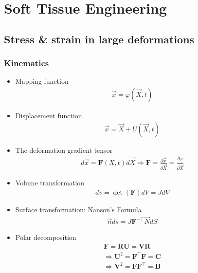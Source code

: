 \documentclass[../main.tex]{subfiles}
\begin{document}
\chapter{Soft Tissue Engineering}

\section{Stress \& strain in large deformations}

\subsection{Kinematics}

\begin{itemize}
    \item Mapping function 
    \begin{align}
        \vec{x} = \underline{\varphi}(\vec{X},t)
    \end{align}
    \item Displacement function
    \begin{align}
        \vec{x} = \vec{X} + \underline{U}(\vec{X},t)
    \end{align}
    \item The deformation gradient tensor
    \begin{align}
        d\vec{x} = \textbf{F}(X,t)d\vec{X} \Rightarrow \textbf{F} = \frac{\partial \vec{x}}{\partial \vec{X}} = \frac{\partial \underline{\varphi}}{\partial \vec{X}}
    \end{align}
    \item Volume transformation
    \begin{align}
        dv = \det(\textbf{F})dV=JdV
    \end{align}
    \item Surface transformation: Nanson's Formula
    \begin{align}
        \vec{n}ds = J\textbf{F}^{-\top}\vec{N}dS
    \end{align}
    \item Polar decomposition
    \begin{align}
        \textbf{F} = \textbf{R}\textbf{U} = \textbf{V}\textbf{R} \\
        \Rightarrow \textbf{U}^2 = \textbf{F}^{\top}\textbf{F} = \textbf{C}\\
        \Rightarrow \textbf{V}^2 = \textbf{F}\textbf{F}^{\top} = \textbf{B}
    \end{align}
\end{itemize}
\end{document}
